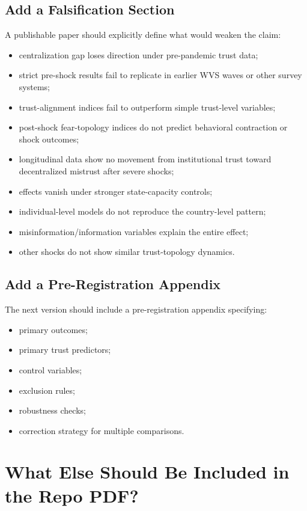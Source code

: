 \documentclass[12pt]{article}
\begin{document}
\subsection{Add a Falsification Section}

A publishable paper should explicitly define what would weaken the claim:

\begin{itemize}
  \item centralization gap loses direction under pre-pandemic trust data;
  \item strict pre-shock results fail to replicate in earlier WVS waves or other survey systems;
  \item trust-alignment indices fail to outperform simple trust-level variables;
  \item post-shock fear-topology indices do not predict behavioral contraction or shock outcomes;
  \item longitudinal data show no movement from institutional trust toward decentralized mistrust after severe shocks;
  \item effects vanish under stronger state-capacity controls;
  \item individual-level models do not reproduce the country-level pattern;
  \item misinformation/information variables explain the entire effect;
  \item other shocks do not show similar trust-topology dynamics.
\end{itemize}

\subsection{Add a Pre-Registration Appendix}

The next version should include a pre-registration appendix specifying:

\begin{itemize}
  \item primary outcomes;
  \item primary trust predictors;
  \item control variables;
  \item exclusion rules;
  \item robustness checks;
  \item correction strategy for multiple comparisons.
\end{itemize}

\section{What Else Should Be Included in the Repo PDF?}
\end{document}
